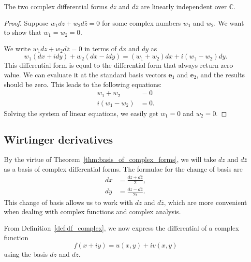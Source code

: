 \begin{svgraybox}
	\begin{theorem} The two complex differential forms $dz$ and $d\bar{z}$ are linearly independent over $\mathbb{C}$. \label{thm:basis_of_complex_forms}
	\end{theorem}
\end{svgraybox}


\begin{proof}
	Suppose
	$
	w_1 dz + w_2 d\bar{z} = 0$
	for some complex numbers $w_1$ and $w_2$.
	We want to show that $w_1=w_2=0$.
	
	We write  $w_1 dz + w_2 d\bar{z}=0$ in terms of $dx$ and $dy$ as
	$$
	w_1 (dx + i dy) + w_2 (dx - i dy) =
	(w_1+w_2) dx + i (w_1-w_2) dy .
	$$
	This differential form is equal to the differential form that always return zero value. We can evaluate it at the standard basis vectors $\mathbf{e}_1$ and $\mathbf{e}_2$, and the results should be zero. This leads to the following equations:
	\begin{align*}
		w_1+w_2 &=0 \\
		i(w_1-w_2) &=0.
	\end{align*}
	Solving the system of linear equations, we easily get  $w_1=0$ and $w_2=0$. 
\end{proof}




\subsection{Wirtinger derivatives}

\label{sec:del_bar}

By the virtue of Theorem~\ref{thm:basis_of_complex_forms}, we will take $dz$ and $d\bar{z}$ as a basis of complex differential forms. The formulae for the change of basis are
\begin{align}
	dx &= \frac{dz + d\bar{z}}{2} , \label{eq:dx_dz_dbarz}\\
	dy &= \frac{dz - d\bar{z}}{2i}. \label{eq:dy_dz_dbarz}
\end{align}
This change of basis allows us to work with $dz$ and $d\bar{z}$, which are more convenient when dealing with complex functions and complex analysis.


From  Definition~\ref{def:df_complex}, we now express the differential of  a complex function 
$$f(x+iy) = u(x,y) + i v(x,y)$$
using the basis $dz$ and $d\bar{z}$.


